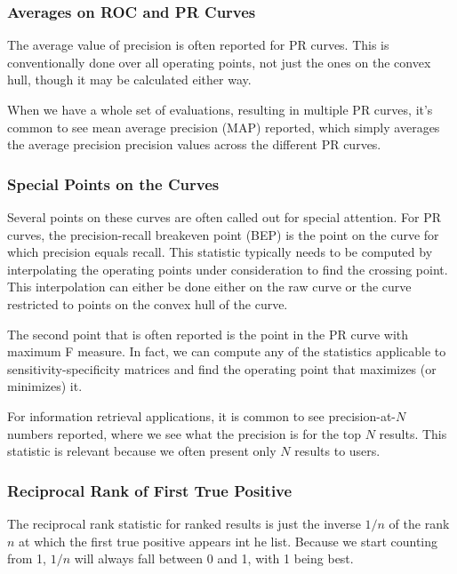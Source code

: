 \subsubsection{Averages on ROC and PR Curves}

The average value of precision is often reported for PR curves.  This
is conventionally done over all operating points, not just the ones on
the convex hull, though it may be calculated either way.  

When we have a whole set of evaluations, resulting in multiple PR
curves, it's common to see mean average precision (MAP) reported,
which simply averages the average precision precision values across
the different PR curves.


\subsubsection{Special Points on the Curves}

Several points on these curves are often called out for special
attention.  For PR curves, the precision-recall breakeven point (BEP)
is the point on the curve for which precision equals recall.  This
statistic typically needs to be computed by interpolating the
operating points under consideration to find the crossing point.  This
interpolation can either be done either on the raw curve or the curve
restricted to points on the convex hull of the curve.

The second point that is often reported is the point in the PR curve
with maximum F measure.  In fact, we can compute any of the statistics
applicable to sensitivity-specificity matrices and find the operating
point that maximizes (or minimizes) it.

For information retrieval applications, it is common to see
precision-at-$N$ numbers reported, where we see what the precision is
for the top $N$ results.  This statistic is relevant because we often
present only $N$ results to users.


\subsubsection{Reciprocal Rank of First True Positive}

The reciprocal rank statistic for ranked results is just the inverse
$1/n$ of the rank $n$ at which the first true positive appears int he
list.  Because we start counting from 1, $1/n$ will always fall
between 0 and 1, with 1 being best.  


